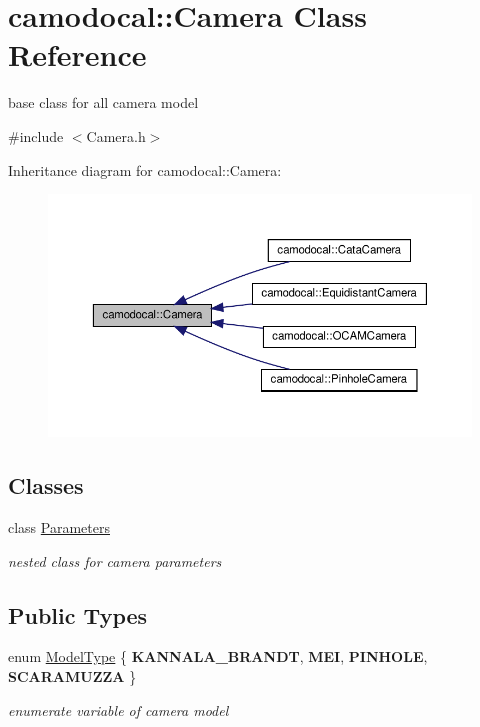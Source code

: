 \hypertarget{classcamodocal_1_1Camera}{}\section{camodocal\+:\+:Camera Class Reference}
\label{classcamodocal_1_1Camera}


base class for all camera model  




{\ttfamily \#include $<$Camera.\+h$>$}



Inheritance diagram for camodocal\+:\+:Camera\+:\nopagebreak
\begin{figure}[H]
\begin{center}
\leavevmode
\includegraphics[width=350pt]{classcamodocal_1_1Camera__inherit__graph}
\end{center}
\end{figure}
\subsection*{Classes}
\begin{DoxyCompactItemize}
\item 
class \hyperlink{classcamodocal_1_1Camera_1_1Parameters}{Parameters}
\begin{DoxyCompactList}\small\item\em nested class for camera parameters \end{DoxyCompactList}\end{DoxyCompactItemize}
\subsection*{Public Types}
\begin{DoxyCompactItemize}
\item 
\mbox{\label{classcamodocal_1_1Camera_a663bb19b7b1f38f6d1b7eeb0890183ff}} 
enum \hyperlink{classcamodocal_1_1Camera_a663bb19b7b1f38f6d1b7eeb0890183ff}{Model\+Type} \{ {\bfseries K\+A\+N\+N\+A\+L\+A\+\_\+\+B\+R\+A\+N\+DT}, 
{\bfseries M\+EI}, 
{\bfseries P\+I\+N\+H\+O\+LE}, 
{\bfseries S\+C\+A\+R\+A\+M\+U\+Z\+ZA}
 \}\begin{DoxyCompactList}\small\item\em enumerate variable of camera model \end{DoxyCompactList}
\end{DoxyCompactItemize}
